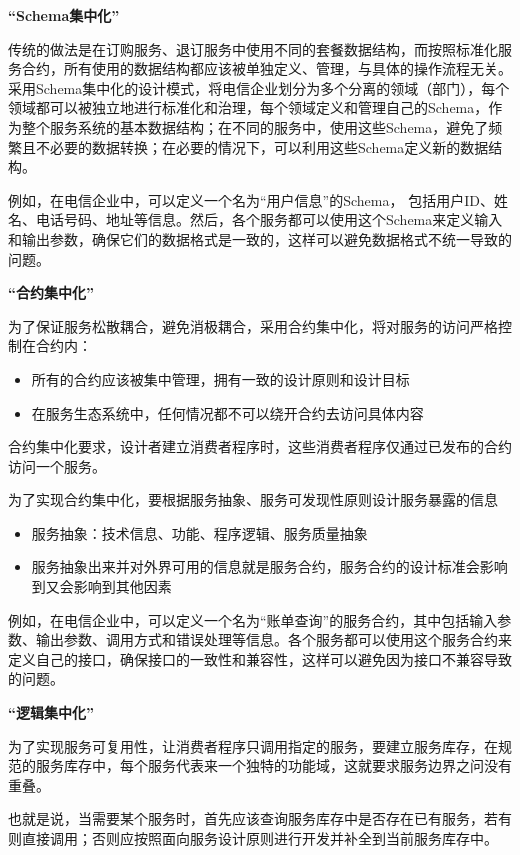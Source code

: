 \begin{solution}
\textbf{“Schema集中化”} \par
传统的做法是在订购服务、退订服务中使用不同的套餐数据结构，而按照标准化服务合约，所有使用的数据结构都应该被单独定义、管理，与具体的操作流程无关。采用Schema集中化的设计模式，将电信企业划分为多个分离的领域（部门），每个领域都可以被独立地进行标准化和治理，每个领域定义和管理自己的Schema，作为整个服务系统的基本数据结构；在不同的服务中，使用这些Schema，避免了频繁且不必要的数据转换；在必要的情况下，可以利用这些Schema定义新的数据结构。

例如，在电信企业中，可以定义一个名为“用户信息”的Schema， 包括用户ID、姓名、电话号码、地址等信息。然后，各个服务都可以使用这个Schema来定义输入和输出参数，确保它们的数据格式是一致的，这样可以避免数据格式不统一导致的问题。

\textbf{“合约集中化”} \par
为了保证服务松散耦合，避免消极耦合，采用合约集中化，将对服务的访问严格控制在合约内：
\begin{itemize}
    \item 所有的合约应该被集中管理，拥有一致的设计原则和设计目标
    \item 在服务生态系统中，任何情况都不可以绕开合约去访问具体内容
\end{itemize}

合约集中化要求，设计者建立消费者程序时，这些消费者程序仅通过已发布的合约访问一个服务。

为了实现合约集中化，要根据服务抽象、服务可发现性原则设计服务暴露的信息
\begin{itemize}
    \item 服务抽象：技术信息、功能、程序逻辑、服务质量抽象
    \item 服务抽象出来并对外界可用的信息就是服务合约，服务合约的设计标准会影响到又会影响到其他因素
\end{itemize}

例如，在电信企业中，可以定义一个名为“账单查询”的服务合约，其中包括输入参数、输出参数、调用方式和错误处理等信息。各个服务都可以使用这个服务合约来定义自己的接口，确保接口的一致性和兼容性，这样可以避免因为接口不兼容导致的问题。

\textbf{“逻辑集中化”} \par
为了实现服务可复用性，让消费者程序只调用指定的服务，要建立服务库存，在规范的服务库存中，每个服务代表来一个独特的功能域，这就要求服务边界之问没有重叠。

也就是说，当需要某个服务时，首先应该查询服务库存中是否存在已有服务，若有则直接调用；否则应按照面向服务设计原则进行开发并补全到当前服务库存中。


\end{solution}
